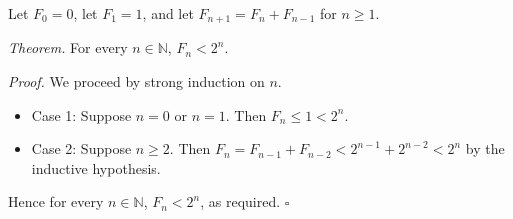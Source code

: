 Let $F_{0} = 0$, let $F_{1} = 1$, and let $F_{n + 1} = F_{n} + F_{n - 1}$ for $n \geq 1$.

\textit{Theorem.} For every $n \in \mathbb{N}$, $F_{n} < 2^{n}$.

\textit{Proof.} We proceed by strong induction on $n$.

\begin{itemize}
  \item Case 1: Suppose $n = 0$ or $n = 1$.
    Then $F_{n} \leq 1 < 2^{n}$.
  \item Case 2: Suppose $n \geq 2$.
    Then $F_{n} = F_{n - 1} + F_{n - 2} < 2^{n - 1} + 2^{n - 2} < 2^{n}$ by the inductive hypothesis.
\end{itemize}

Hence for every $n \in \mathbb{N}$, $F_{n} < 2^{n}$, as required. \hfill$\square$